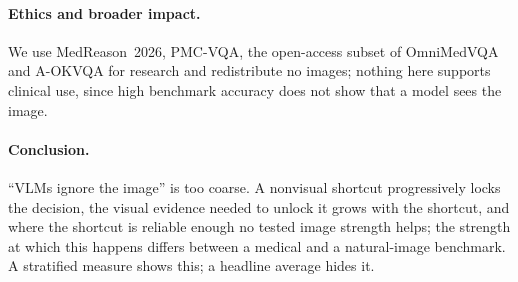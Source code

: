 \paragraph{Ethics and broader impact.}
We use MedReason~2026, PMC-VQA, the open-access subset of OmniMedVQA and A-OKVQA for research and redistribute no images; nothing here supports clinical use, since high benchmark accuracy does not show that a model sees the image.

\paragraph{Conclusion.}
``VLMs ignore the image'' is too coarse.
A nonvisual shortcut progressively locks the decision, the visual evidence needed to unlock it grows with the shortcut, and where the shortcut is reliable enough no tested image strength helps; the strength at which this happens differs between a medical and a natural-image benchmark.
A stratified measure shows this; a headline average hides it.

